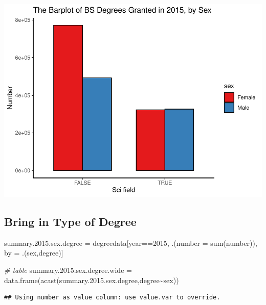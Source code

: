 \documentclass[
  12pt,
]{article}
\newenvironment{Shaded}{\begin{snugshade}}{\end{snugshade}}
\newcommand{\AttributeTok}[1]{\textcolor[rgb]{0.77,0.63,0.00}{#1}}
\newcommand{\CommentTok}[1]{\textcolor[rgb]{0.56,0.35,0.01}{\textit{#1}}}
\newcommand{\DecValTok}[1]{\textcolor[rgb]{0.00,0.00,0.81}{#1}}
\newcommand{\FloatTok}[1]{\textcolor[rgb]{0.00,0.00,0.81}{#1}}
\newcommand{\FunctionTok}[1]{\textcolor[rgb]{0.00,0.00,0.00}{#1}}
\newcommand{\NormalTok}[1]{#1}
\newcommand{\OtherTok}[1]{\textcolor[rgb]{0.56,0.35,0.01}{#1}}
\newcommand{\SpecialCharTok}[1]{\textcolor[rgb]{0.00,0.00,0.00}{#1}}
\begin{document}
\includegraphics{hw1_sol_files/figure-latex/unnamed-chunk-8-1.pdf}

\hypertarget{bring-in-type-of-degree}{%
\subsection{Bring in Type of Degree}\label{bring-in-type-of-degree}}

\begin{Shaded}
\begin{Highlighting}[]
\NormalTok{summary.}\FloatTok{2015.}\NormalTok{sex.degree }\OtherTok{=}\NormalTok{ degreedata[year}\SpecialCharTok{==}\DecValTok{2015}\NormalTok{,}
\NormalTok{                          .(}\AttributeTok{number =} \FunctionTok{sum}\NormalTok{(number)),}
\NormalTok{                          by }\OtherTok{=}\NormalTok{ .(sex,degree)]}

\CommentTok{\# table}
\NormalTok{summary.}\FloatTok{2015.}\NormalTok{sex.degree.wide }\OtherTok{=} \FunctionTok{data.frame}\NormalTok{(}\FunctionTok{acast}\NormalTok{(summary.}\FloatTok{2015.}\NormalTok{sex.degree,degree}\SpecialCharTok{\textasciitilde{}}\NormalTok{sex))}
\end{Highlighting}
\end{Shaded}

\begin{verbatim}
## Using number as value column: use value.var to override.
\end{verbatim}
\end{document}
